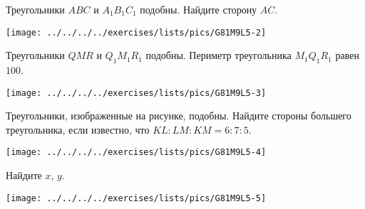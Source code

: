 \begin{class}[number=5]
	\begin{listofex}
		\item 
		\begin{minipage}[t]{\bodywidth}
			Треугольники \( ABC \) и \( A_1B_1C_1 \) подобны. Найдите сторону \( AC \).
		\end{minipage}
		\hspace{0.02\linewidth}
		\begin{minipage}[t]{\picwidth}
			\texttt{[image: ../../../../exercises/lists/pics/G81M9L5-2]}
		\end{minipage}
		\item 
		\begin{minipage}[t]{\bodywidth}
			Треугольники \( QMR \) и \( Q_1M_1R_1 \) подобны. Периметр треугольника \(  M_1Q_1R_1 \) равен \( 100 \).
		\end{minipage}
		\hspace{0.02\linewidth}
		\begin{minipage}[t]{\picwidth}
			\texttt{[image: ../../../../exercises/lists/pics/G81M9L5-3]}
		\end{minipage}
		\item 
		\begin{minipage}[t]{\bodywidth}
			Треугольники, изображенные на рисунке, подобны. Найдите стороны большего треугольника, если известно, что \( KL:LM:KM=6:7:5 \).
		\end{minipage}
		\hspace{0.02\linewidth}
		\begin{minipage}[t]{\picwidth}
			\texttt{[image: ../../../../exercises/lists/pics/G81M9L5-4]}
		\end{minipage}
		\item
		\begin{minipage}[t]{\bodywidth}
			Найдите \( x \), \( y \).
		\end{minipage}
		\hspace{0.02\linewidth}
		\begin{minipage}[t]{\picwidth}
			\texttt{[image: ../../../../exercises/lists/pics/G81M9L5-5]}
		\end{minipage}
		\item

\end{listofex}
\end{class}
